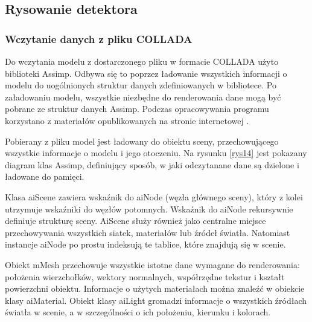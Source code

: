 \subsection{Rysowanie detektora}
\subsubsection{Wczytanie danych z pliku COLLADA}
Do wczytania modelu z dostarczonego pliku w formacie COLLADA użyto biblioteki Assimp. Odbywa się to poprzez ładowanie wszystkich informacji o modelu do uogólnionych struktur danych zdefiniowanych w bibliotece. Po załadowaniu modelu, wszystkie niezbędne do renderowania dane mogą być pobrane ze struktur danych Assimp. Podczas opracowywania programu korzystano z materiałów opublikowanych na stronie internetowej \cite{learnopengl}. 

Pobierany z pliku model jest ładowany do obiektu sceny, przechowującego wszystkie informacje o modelu i jego otoczeniu. Na rysunku \ref{rys14} jest pokazany diagram klas Assimp, definiujący sposób, w jaki odczytanane dane są dzielone i ładowane do pamięci.

Klasa aiScene zawiera wskaźnik do aiNode (węzła głównego sceny), który z kolei utrzymuje wskaźniki do węzłów potomnych. Wskaźnik do aiNode rekursywnie definiuje strukturę sceny. AiScene służy również jako centralne miejsce przechowywania wszystkich siatek, materiałów lub źródeł światła. Natomiast instancje aiNode po prostu indeksują te tablice, które znajdują się w scenie.

Obiekt mMesh przechowuje wszystkie istotne dane wymagane do renderowania: położenia wierzchołków, wektory normalnych, współrzędne tekstur i kształt powierzchni obiektu. Informacje o użytych materiałach można znaleźć w obiekcie klasy aiMaterial. Obiekt klasy aiLight gromadzi informacje o wszystkich źródłach światła w scenie, a w szczególności o ich położeniu, kierunku i kolorach. 

